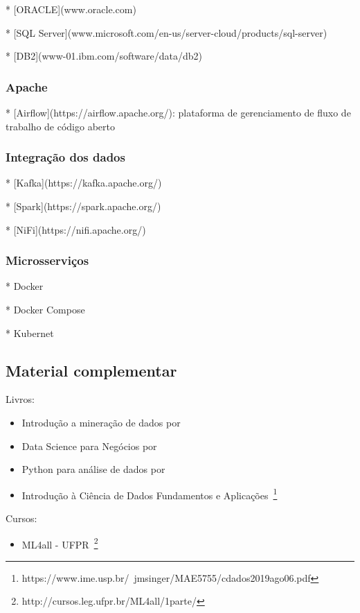 * [ORACLE](www.oracle.com)

* [SQL Server](www.microsoft.com/en-us/server-cloud/products/sql-server)

* [DB2](www-01.ibm.com/software/data/db2)


\subsubsection*{Apache}
* [Airflow](https://airflow.apache.org/): plataforma de gerenciamento de fluxo de trabalho de código aberto


\subsubsection*{Integração dos dados}

* [Kafka](https://kafka.apache.org/)

* [Spark](https://spark.apache.org/)

* [NiFi](https://nifi.apache.org/)
 

\subsubsection*{Microsserviços}

* Docker

* Docker Compose

* Kubernet


\subsection{Material complementar}

Livros:
\begin{itemize}
	\item Introdução a mineração de dados por~
	\item Data Science para Negócios por~
	\item Python para análise de dados por~
	\item Introdução à Ciência de Dados Fundamentos e Aplicações~\footnote{https://www.ime.usp.br/~jmsinger/MAE5755/cdados2019ago06.pdf}
\end{itemize}


Cursos:
\begin{itemize}
	\item ML4all - UFPR~\footnote{http://cursos.leg.ufpr.br/ML4all/1parte/}
\end{itemize}


